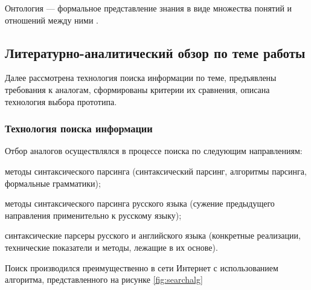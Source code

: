 Онтология --- формальное представление знания в виде множества понятий и отношений между ними \cite{wiki_ont}.

\subsection{Литературно-аналитический обзор по теме работы}
Далее рассмотрена технология поиска информации по теме, предъявлены требования к аналогам, сформированы критерии их сравнения, описана технология выбора прототипа.

\subsubsection{Технология поиска информации}
Отбор аналогов осуществлялся в процессе поиска по следующим направлениям:
\begin{list}{}{\leftmargin=1.5cm}
	\item методы синтаксического парсинга (синтаксический парсинг, алгоритмы парсинга, формальные грамматики);
	\item методы синтаксического парсинга русского языка (сужение предыдущего направления применительно к русскому языку);
	\item синтаксические парсеры русского и английского языка (конкретные реализации, технические показатели и методы, лежащие в их основе).
\end{list}

Поиск производился преимущественно в сети Интернет с использованием алгоритма, представленного на рисунке \ref{fig:searchalg}

